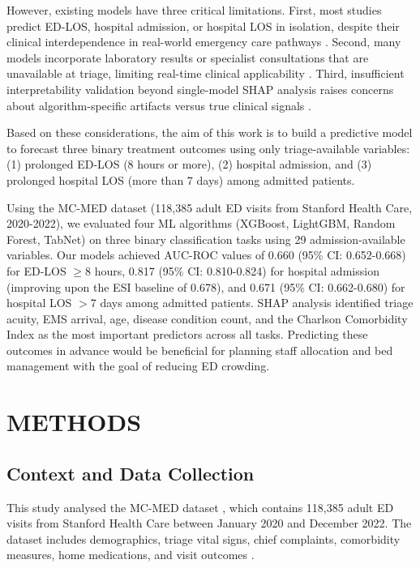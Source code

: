 \documentclass[harvard,article]{frontiersinFPHY_FAMS}
\begin{document}
However, existing models have three critical limitations. First, most studies predict ED-LOS, hospital admission, or hospital LOS in isolation, despite their clinical interdependence in real-world emergency care pathways \cite{stone2022}. Second, many models incorporate laboratory results or specialist consultations that are unavailable at triage, limiting real-time clinical applicability \cite{levin2020}. Third, insufficient interpretability validation beyond single-model SHAP analysis raises concerns about algorithm-specific artifacts versus true clinical signals \cite{slack2022, wang2025}.

Based on these considerations, the aim of this work is to build a predictive model to forecast three binary treatment outcomes using only triage-available variables: (1) prolonged ED-LOS (8 hours or more), (2) hospital admission, and (3) prolonged hospital LOS (more than 7 days) among admitted patients.

Using the MC-MED dataset (118,385 adult ED visits from Stanford Health Care, 2020-2022), we evaluated four ML algorithms (XGBoost, LightGBM, Random Forest, TabNet) on three binary classification tasks using 29 admission-available variables. Our models achieved AUC-ROC values of 0.660 (95\% CI: 0.652-0.668) for ED-LOS $\geq$8 hours, 0.817 (95\% CI: 0.810-0.824) for hospital admission (improving upon the ESI baseline of 0.678), and 0.671 (95\% CI: 0.662-0.680) for hospital LOS $>$7 days among admitted patients. SHAP analysis identified triage acuity, EMS arrival, age, disease condition count, and the Charlson Comorbidity Index as the most important predictors across all tasks. Predicting these outcomes in advance would be beneficial for planning staff allocation and bed management with the goal of reducing ED crowding.

\section{METHODS}

\subsection{Context and Data Collection}

This study analysed the MC-MED dataset \cite{kansal2025, kansal2025b}, which contains 118,385 adult ED visits from Stanford Health Care between January 2020 and December 2022. The dataset includes demographics, triage vital signs, chief complaints, comorbidity measures, home medications, and visit outcomes \cite{goldberger2000}.
\end{document}
